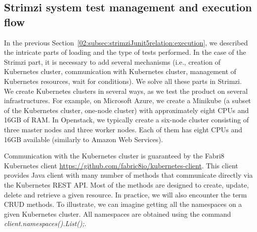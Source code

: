 \subsection{Strimzi system test management and execution flow}
\label{02:subsec:strimzisystemtestsexecution}

In the previous Section~\ref{02:subsec:strimziJunit5relation:execution}, we described the intricate parts of loading and the type of tests performed.
In the case of the Strimzi part, it is necessary to add several mechanisms (i.e., creation of Kubernetes cluster, communication with Kubernetes cluster, management of Kubernetes resources, wait for conditions).
We solve all these parts in Strimzi.
We create Kubernetes clusters in several ways, as we test the product on several infrastructures.
For example, on Microsoft Azure, we create a Minikube (a subset of the Kubernetes cluster, one-node cluster) with approximately eight CPUs and 16GB of RAM. In Openstack, we typically create a six-node cluster consisting of three master nodes and three worker nodes.
Each of them has eight CPUs and 16GB available (similarly to Amazon Web Services).

Communication with the Kubernetes cluster is guaranteed by the Fabri8 Kubernetes client \url {https://github.com/fabric8io/kubernetes-client}.
This client provides Java client with many number of methods that communicate directly via the Kubernetes REST API.
Most of the methods are designed to create, update, delete and retrieve a given resource.
In practice, we will also encounter the term CRUD methods.
To illustrate, we can imagine getting all the namespaces on a given Kubernetes cluster.
All namespaces are obtained using the command \emph{client.namespaces().List();}.

